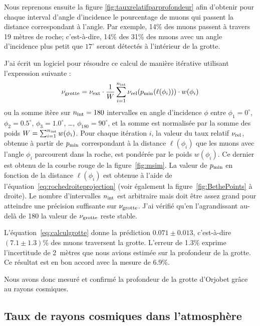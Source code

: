 \documentclass[a4paper, 12pt]{article}
\begin{document}
\begin{spacing}{1.5}
Nous reprenons ensuite la figure \ref{fig:tauxrelatifparprofondeur} afin d'obtenir pour chaque interval d'angle d'incidence le pourcentage de muons qui passent la distance correspondant à l'angle. Par exemple, 14\% des muons passent à travers 19 mètres de roche; c'est-à-dire, 14\% des 31\% des muons avec un angle d'incidence plus petit que $17^\circ$ seront détectés à l'intérieur de la grotte. 

J'ai écrit un logiciel pour résoudre ce calcul de manière itérative utilisant l'expression suivante :
\begin{equation}
  \nu_{\rm grotte} = \nu_{\rm ext}\cdot \frac{1}{W}\sum_{i=1}^{n_{\rm int}}\nu_{\rm rel}(p_{\rm min}(\ell(\phi_i)))\cdot w(\phi_i)  
  \label{eq:calculgrotte}
\end{equation}
ou la somme itère sur $n_{\rm int}=180$ intervalles en angle d'incidence $\phi$ entre $\phi_1=0^\circ$, $\phi_2=0.5^\circ$, $\phi_3=1.0^\circ$, \dots, $\phi_{180}=90^\circ$, et la somme est normalisée par la somme des poids $W=\sum_{i=1}^{n_{\rm int}}w(\phi_i)$. Pour chaque itération $i$, la valeur du taux relatif $\nu_{\rm rel}$, obtenue à partir de $p_{\rm min}$ correspondant à la distance $\ell(\phi_i)$ que les muons avec l'angle $\phi_i$ parcourent dans la roche, est pondérée par le poids $w(\phi_i)$. Ce dernier est obtenu de la courbe rouge de la figure~\ref{fig:msim}. La valeur de $p_{\rm min}$ en fonction de la distance $\ell(\phi_i)$ est obtenue à l'aide de l'équation~\ref{eq:rochedroiteprojection} (voir également la figure~\ref{fig:BethePoints} à droite). Le nombre d'intervalles $n_{\rm int}$ est arbitraire mais doit être assez grand pour atteindre une précision suffisante sur $\nu_{\rm grotte}$. J'ai vérifié qu'en l'agrandissant au-delà de 180 la valeur de $\nu_{\rm grotte}$ reste stable. 

L'équation~\ref{eq:calculgrotte} donne la prédiction $0.071\pm0.013$, c'est-à-dire $(7.1\pm1.3)$\% des muons traversent la grotte. L'erreur de 1.3\% exprime l'incertitude de 2~mètres que nous avions estimée sur la profondeur de la grotte. Ce résultat est en bon accord avec la mesure de 6.9\%.

Nous avons donc mesuré et confirmé la profondeur de la grotte d'Orjobet grâce au rayons cosmiques.


\subsection{Taux de rayons cosmiques dans l'atmosphère}


\end{spacing}
\end{document}
